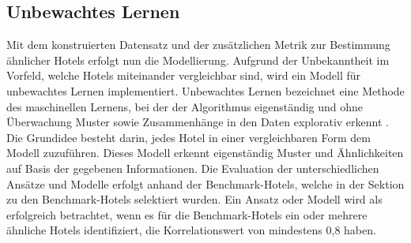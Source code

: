 \subsection{Unbewachtes Lernen}
\label{subsec:un_lear}
Mit dem konstruierten Datensatz und der zusätzlichen Metrik zur Bestimmung ähnlicher Hotels erfolgt nun die Modellierung. Aufgrund der Unbekanntheit im Vorfeld, welche Hotels miteinander vergleichbar sind, wird ein Modell für unbewachtes Lernen implementiert. Unbewachtes Lernen bezeichnet eine Methode des maschinellen Lernens, bei der der Algorithmus eigenständig und ohne Überwachung Muster sowie Zusammenhänge in den Daten explorativ erkennt \cite{datasolutGmbH.05.02.2024}. Die Grundidee besteht darin, jedes Hotel in einer vergleichbaren Form dem Modell zuzuführen. Dieses Modell erkennt eigenständig Muster und Ähnlichkeiten auf Basis der gegebenen Informationen.
\newline
\newline
Die Evaluation der unterschiedlichen Ansätze und Modelle erfolgt anhand der Benchmark-Hotels, welche in der Sektion zu den Benchmark-Hotels selektiert wurden. Ein Ansatz oder Modell wird als erfolgreich betrachtet, wenn es für die Benchmark-Hotels ein oder mehrere ähnliche Hotels identifiziert, die Korrelationswert von mindestens 0,8 haben.




